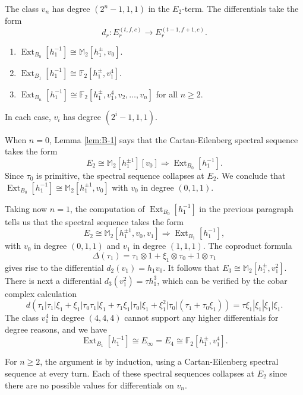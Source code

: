 \documentclass[10pt]{amsart}
\begin{document}
The class $v_n$ has degree $(2^n-1,1,1)$ in the $E_2$-term.
The differentials take the form
\[ d_r:E_r^{(t,f,c)} {\longrightarrow} E_r^{(t-1,f+1,c)}.\]

\begin{prop}\label{MainExtProp} 
\mbox{}
\begin{enumerate}
\item $\operatorname{Ext}_{B_0}[h_1^{-1}] {\cong} {\ensuremath{\mathbb{M}}}_2[h_1^\pm,v_0]$.
\item $\operatorname{Ext}_{B_1}[h_1^{-1}] {\cong} {\ensuremath{\mathbb{F}}}_2[h_1^\pm,v_1^4]$.
\item
$\operatorname{Ext}_{B_n}[h_1^{-1}] {\cong} {\ensuremath{\mathbb{F}}}_2[h_1^\pm,v_1^4,v_2,\dots,v_n]$
for all $n \geq 2$.
\end{enumerate}
In each case, $v_i$ has degree $(2^i-1,1,1)$.
\end{prop}

\begin{pf}
When $n=0$, Lemma \ref{lem:B-1} says that
the Cartan-Eilenberg spectral sequence takes the form
\[ E_2 {\cong} {\ensuremath{\mathbb{M}}}_2[h_1^{\pm 1}][v_0] \Rightarrow \operatorname{Ext}_{B_0}[h_1^{-1}].\]
Since $\tau_0$ is primitive, the spectral sequence collapses at $E_2$. 
We conclude that $\operatorname{Ext}_{B_0}[h_1^{-1}]{\cong} {\ensuremath{\mathbb{M}}}_2[h_1^{\pm 1},v_0]$ with $v_0$ in degree $(0,1,1)$.

Taking now $n=1$, 
the computation of $\operatorname{Ext}_{B_0}[h_1^{-1}]$ in the previous paragraph tells
us that 
the spectral sequence takes the form
\[ E_2 {\cong} {\ensuremath{\mathbb{M}}}_2[h_1^{\pm 1},v_0,v_1] \Rightarrow \operatorname{Ext}_{B_1}[h_1^{-1}],\]
with $v_0$ in degree $(0,1,1)$ and $v_1$ in degree $(1,1,1)$.
The coproduct formula 
\[\Delta(\tau_1) = \tau_1\otimes 1 + \xi_1\otimes \tau_0 + 1\otimes \tau_1\]
 gives rise to the differential $d_2(v_1) = h_1v_0$. 
It follows that $E_3 {\cong} {\ensuremath{\mathbb{M}}}_2[h_1^\pm, v_1^2]$. There is next a differential $d_3(v_1^2) = \tau h_1^3$, which can be verified by the cobar complex calculation
\[
d( \tau_1|\tau_1 | \xi_1 + \xi_1 | \tau_0\tau_1 | \xi_1 + \tau_1\xi_1 | \tau_0 | \xi_1 + \xi_1^2 | \tau_0 | (\tau_1+\tau_0\xi_1)) = \tau \xi_1 | \xi_1 | \xi_1 | \xi_1.
\]
The class $v_1^4$ in degree $(4,4,4)$ cannot support any higher differentials for degree reasons, and we have
\[ \operatorname{Ext}_{B_1}[h_1^{-1}] {\cong} E_\infty=E_4  {\cong} {\ensuremath{\mathbb{F}}}_2[h_1^\pm,v_1^4].\]

For $n\geq 2$, 
the argument is by induction, using a Cartan-Eilenberg spectral sequence at every turn. Each of these spectral sequences collapses at $E_2$ since 
there are no possible values for differentials on $v_n$.
\end{pf}
\end{document}
